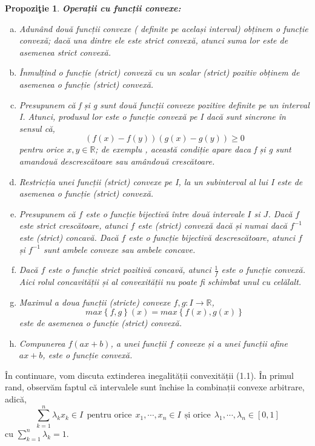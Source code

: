 \documentclass[a4paper,12pt,oneside]{report}
\newtheorem{proposition}{Propozi\c tie}
\begin{document}
\begin{proposition}
\textbf{Operații cu funcții convexe:}
\begin{enumerate}[a)]
\item Adunând două funcții convexe ( definite pe același interval) obținem o funcție convexă; dacă una dintre ele este strict convexă, atunci suma lor este de asemenea strict convexă.
\item Înmulțind o funcție (strict) convexă cu un scalar (strict)  pozitiv obținem de asemenea o funcție (strict) convexă.
\item Presupunem că f și g sunt două funcții convexe pozitive definite pe un interval I. Atunci, produsul lor este o funcție convexă pe I dacă sunt sincrone în sensul că, \begin{displaymath}
   \left ( f\left ( x \right ) - f\left ( y \right ) \right )\left ( g\left ( x \right ) - g\left ( y \right )\right )\geq 0
\end{displaymath} pentru orice \(x , y \in \mathbb{R}\); de exemplu , această condiție apare daca f și g sunt amandouă descrescătoare sau amândouă crescătoare.
\item Restricția unei funcții (strict) convexe pe I, la un subinterval al lui I este de asemenea o funcție (strict) convexă.
\item Presupunem că \(f\) este o funcție bijectivă între două intervale \(I\) si \(J\). Dacă \(f\) este strict crescătoare, atunci \(f\) este (strict) convexă dacă și numai dacă \(f^{-1}\) este (strict) concavă. Dacă \(f\) este o funcție bijectivă descrescătoare, atunci \(f\) și  \(f^{-1}\) sunt ambele convexe sau ambele concave.
\item Dacă \(f\) este o funcție strict pozitivă concavă, atunci \(\frac{1}{f}\) este o funcție convexă. Aici rolul concavității și al convexității nu poate fi schimbat unul cu celălalt.
\item Maximul a doua funcții (stricte) convexe \(f , g : I \rightarrow \mathbb{R}\),
\begin{displaymath}
  max \left \{ f , g \right \}\left ( x \right )=  max \left \{ f\left ( x \right ), g\left ( x \right ) \right \}
\end{displaymath} este de asemenea o funcție (strict) convexă.
\item Compunerea \(f\left ( ax + b \right )\), a unei funcții \(f\) convexe și a unei funcții afine \(ax+b\), este o funcție convexă.
\end{enumerate}
\end{proposition}
În continuare, vom discuta extinderea inegalității convexității (1.1). În primul rand, observăm faptul că intervalele sunt închise la combinații convexe arbitrare, adică,
\begin{displaymath}
  \sum_{ k= 1}^{n}\lambda _{k}x_{k} \in I~~\mbox{pentru orice}~~x_{1},\cdots, x_{n} \in I  ~~\mbox{și orice}~~\lambda _{1},\cdots, \lambda _{n} \in \left [ 0 , 1  \right ]
\end{displaymath}
 cu \(\sum_{k = 1}^{n} \lambda _{k} = 1\).
\end{document}
